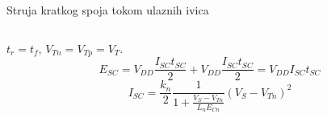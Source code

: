 \begin{frame}[label=09_2-s058]{Struja kratkog spoja tokom ulaznih ivica}
\par\vspace{0mm}\begin{columns}[T,onlytextwidth]\centering {}\centering \end{columns}\par $t_r=t_f$, $V_{Tn}=V_{Tp}=V_T$.\[E_{SC}=V_{DD}\frac{I_{SC}t_{SC}}2+V_{DD}\frac{I_{SC}t_{SC}}2=V_{DD}I_{SC}t_{SC}\]
\[I_{SC}=\frac{k_n}2\frac1{1+\frac{V_S-V_{Tn}}{L_nE_{Cn}}}(V_S-V_{Tn})^2\]

\end{frame}
